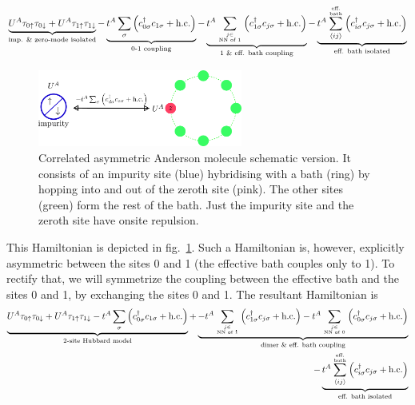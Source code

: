 \documentclass{article}
\numberwithin{equation}{section}
\begin{document}
\begin{equation}\begin{aligned}
	\underbrace{U^A\tau_{0 \uparrow}\tau_{0 \downarrow} + U^A\tau_{1 \uparrow}\tau_{1 \downarrow}}_\text{imp. \& zero-mode isolated} - \underbrace{t^A\sum_{\sigma}\left(c^\dagger_{0\sigma}c_{1\sigma} + \text{h.c.}\right)}_\text{0-1 coupling} - \underbrace{t^A\sum_{j \in \atop{\text{NN of 1}}}\left(c^\dagger_{1\sigma}c_{j\sigma} + \text{h.c.}\right)}_\text{1 \& eff. bath coupling} - \underbrace{t^A \sum_{\left<ij \right>}^{\text{eff.} \atop{\text{bath}}}\left(c^\dagger_{i\sigma}c_{j\sigma} + \text{h.c.}\right)}_\text{eff. bath isolated}
\end{aligned}\end{equation}
\begin{figure}[htpb]
	\centering
	\includegraphics[width=0.6\textwidth]{gen_siam.png}
	\caption{Correlated asymmetric Anderson molecule schematic version. It consists of an impurity site (blue) hybridising with a bath (ring) by hopping into and out of the zeroth site (pink). The other sites (green) form the rest of the bath. Just the impurity site and the zeroth site have onsite repulsion.}
	\label{and_mol}
\end{figure}
This Hamiltonian is depicted in fig.~\ref{and_mol}. Such a Hamiltonian is, however, explicitly asymmetric between the sites 0 and 1 (the effective bath couples only to 1). To rectify that, we will symmetrize the coupling between the effective bath and the sites 0 and 1, by exchanging the sites 0 and 1. The resultant Hamiltonian is
\begin{equation}\begin{aligned}
	\underbrace{U^A\tau_{0 \uparrow}\tau_{0 \downarrow} + U^A\tau_{1 \uparrow}\tau_{1 \downarrow} - t^A\sum_{\sigma}\left(c^\dagger_{0\sigma}c_{1\sigma} + \text{h.c.}\right)}_\text{2-site Hubbard model} +\underbrace{- t^A\sum_{j \in \atop{\text{NN of 1}}}\left(c^\dagger_{1\sigma}c_{j\sigma} + \text{h.c.}\right)- t^A\sum_{j \in \atop{\text{NN of 0}}}\left(c^\dagger_{0\sigma}c_{j\sigma} + \text{h.c.}\right)}_\text{dimer \& eff. bath coupling} \\
	- \underbrace{t^A \sum_{\left<ij \right>}^{\text{eff.} \atop{\text{bath}}}\left(c^\dagger_{i\sigma}c_{j\sigma} + \text{h.c.}\right)}_\text{eff. bath isolated}
\end{aligned}\end{equation}
\end{document}

